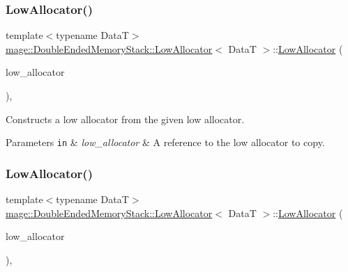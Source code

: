 \subsubsection{\texorpdfstring{Low\+Allocator()}{LowAllocator()}\hspace{0.1cm}{\footnotesize\ttfamily [1/4]}}
{\footnotesize\ttfamily template$<$typename DataT$>$ \\
\hyperlink{structmage_1_1_double_ended_memory_stack_1_1_low_allocator}{mage\+::\+Double\+Ended\+Memory\+Stack\+::\+Low\+Allocator}$<$ DataT $>$\+::\hyperlink{structmage_1_1_double_ended_memory_stack_1_1_low_allocator}{Low\+Allocator} (\begin{DoxyParamCaption}\item[{const \hyperlink{structmage_1_1_double_ended_memory_stack_1_1_low_allocator}{Low\+Allocator}$<$ DataT $>$ \&}]{low\+\_\+allocator }\end{DoxyParamCaption})\hspace{0.3cm}{\ttfamily [default]}, {\ttfamily [noexcept]}}

Constructs a low allocator from the given low allocator.


\begin{DoxyParams}[1]{Parameters}
\mbox{\tt in}  & {\em low\+\_\+allocator} & A reference to the low allocator to copy. \\
\hline
\end{DoxyParams}
\hypertarget{structmage_1_1_double_ended_memory_stack_1_1_low_allocator_a72a6db54a792613d30eb5cf71ceed694}{}\label{structmage_1_1_double_ended_memory_stack_1_1_low_allocator_a72a6db54a792613d30eb5cf71ceed694} 
\subsubsection{\texorpdfstring{Low\+Allocator()}{LowAllocator()}\hspace{0.1cm}{\footnotesize\ttfamily [2/4]}}
{\footnotesize\ttfamily template$<$typename DataT$>$ \\
\hyperlink{structmage_1_1_double_ended_memory_stack_1_1_low_allocator}{mage\+::\+Double\+Ended\+Memory\+Stack\+::\+Low\+Allocator}$<$ DataT $>$\+::\hyperlink{structmage_1_1_double_ended_memory_stack_1_1_low_allocator}{Low\+Allocator} (\begin{DoxyParamCaption}\item[{\hyperlink{structmage_1_1_double_ended_memory_stack_1_1_low_allocator}{Low\+Allocator}$<$ DataT $>$ \&\&}]{low\+\_\+allocator }\end{DoxyParamCaption})\hspace{0.3cm}{\ttfamily [default]}, {\ttfamily [noexcept]}}


